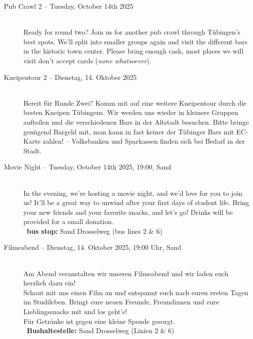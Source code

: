 \begin{description}
\ifml
\item[Pub Crawl 2 -- Tuesday, October 14th 2025]~\\
    Ready for round two? Join us for another pub crawl through Tübingen's best spots.
    We'll split into smaller groups again and visit the different bars in the historic town center.
    Please bring enough cash, most places we will visit don't accept cards (\emph{none whatsoever}).
\else
\item[Kneipentour 2 -- Dienstag, 14. Oktober 2025]~\\
    Bereit für Runde Zwei? Komm mit auf eine weitere Kneipentour durch die besten Kneipen Tübingens.
    Wir werden uns wieder in kleinere Gruppen aufteilen und die verschiedenen Bars in der Altstadt besuchen.
    Bitte bringe genügend Bargeld mit, man kann in fast keiner der Tübinger Bars mit EC-Karte zahlen! -- Volksbanken und Sparkassen finden sich bei Bedarf in der Stadt.
\fi

\ifml
    \item[Movie Night -- Tuesday, October 14th 2025, 19:00, Sand]~\\%
    In the evening, we're hosting a movie night, and we'd love for you to join us!
    It'll be a great way to unwind after your first days of student life.
    Bring your new friends and your favorite snacks, and let's go!
    Drinks will be provided for a small donation.\\
    ~\textbf{bus stop:} Sand Drosselweg (bus lines 2 \& 6)
\else
    \item[Filmeabend -- Dienstag, 14. Oktober 2025, 19:00 Uhr, Sand]~\\
    Am Abend veranstalten wir unseren Filmeabend und wir laden euch herzlich dazu ein!\\
    Schaut mit uns einen Film an und entspannt euch nach euren ersten Tagen im Studileben.
    Bringt eure neuen Freunde, Freundinnen und eure Lieblingssnacks mit und los geht's!\\
    Für Getränke ist gegen eine kleine Spende gesorgt.\\
    ~\textbf{Bushaltestelle:} Sand Drosselweg (Linien 2 \& 6)
\fi

\ifbachelor \pagebreak \fi
\ifmaster \ifinfo \iflehramt \else \pagebreak \fi \fi \fi
\ifmaster \ifmedien \pagebreak \fi \fi
\ifmaster \ifmedinfo \pagebreak \fi \fi
\ifmaster \ifkogwiss \pagebreak \fi \fi


\end{description}
